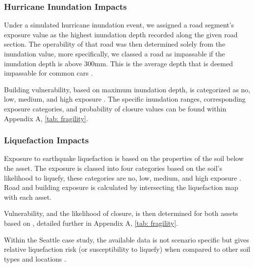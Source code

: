 \documentclass[review,3p,times,onecolumn,sort&compress,12pt]{elsarticle}
\let \cite \parencite
\begin{document}
\subsubsection{Hurricane Inundation Impacts}
Under a simulated hurricane inundation event, we assigned a road segment's exposure value as the highest inundation depth recorded along the given road section.
The operability of that road was then determined solely from the inundation value, more specifically, we classed a road as impassable if the inundation depth is above 300mm.
This is the average depth that is deemed impassable for common cars \cite{Pregnolato2017-gn}.

Building vulnerability, based on maximum inundation depth, is categorized as no, low, medium, and high exposure \cite{Nofal2020-ti}.
The specific inundation ranges, corresponding exposure categories, and probability of closure values can be found within Appendix A, \autoref{tab: fragility}. %

\subsubsection{Liquefaction Impacts}
Exposure to earthquake liquefaction is based on the properties of the soil below the asset.
The exposure is classed into four categories based on the soil's likelihood to liquefy, these categories are no, low, medium, and high exposure \cite{Wang_Chaofeng2021-jc, lin2018empirical}.
Road and building exposure is calculated by intersecting the liquefaction map with each asset.

Vulnerability, and the likelihood of closure, is then determined for both assets based on \cite{Wang_Chaofeng2021-jc, lin2018empirical}, detailed further in Appendix A, \autoref{tab: fragility}.

Within the Seattle case study, the available data is not scenario specific but gives relative liquefaction risk (or susceptibility to liquefy) when compared to other soil types and locations \cite{Seattle_Office_of_Emergency_Management2014-vt}.
\end{document}
